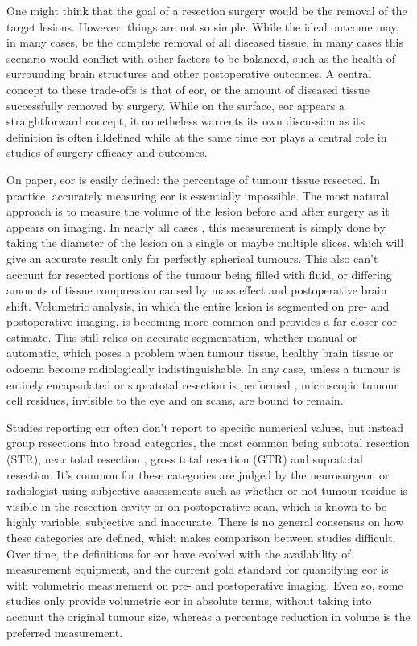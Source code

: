 One might think that the goal of a resection surgery would be the removal of the target lesions.
However, things are not so simple.
While the ideal outcome may, in many cases, be the complete removal of all diseased tissue, in many cases this scenario would conflict with other factors to be balanced, such as the health of surrounding brain structures and other postoperative outcomes.
A central concept to these trade-offs is that of \gls{eor}, or the amount of diseased tissue  successfully removed by surgery.
While on the surface, \gls{eor} appears a straightforward concept, it nonetheless warrents its own discussion as its definition is often illdefined while at the same time \gls{eor} plays a central role in studies of surgery efficacy and outcomes.

On paper, \gls{eor} is easily defined: the percentage of tumour tissue resected.
In practice, accurately measuring \gls{eor} is essentially impossible.
The most natural approach is to measure the volume of the lesion before and after surgery as it appears on imaging.
In nearly all cases , this measurement is simply done by taking the diameter of the lesion on a single or maybe multiple slices, which will give an accurate result only for perfectly spherical tumours.
This also can't account for resected portions of the tumour being filled with fluid, or differing amounts of tissue compression caused by mass effect and postoperative brain shift.
Volumetric analysis, in which the entire lesion is segmented on pre- and postoperative imaging, is becoming more common and provides a far closer \gls{eor} estimate.
This still relies on accurate segmentation, whether manual or automatic, which poses a problem when tumour tissue, healthy brain tissue or odoema become radiologically indistinguishable.
In any case, unless a tumour is entirely encapsulated  or supratotal resection is performed , microscopic tumour cell residues, invisible to the eye and on scans, are bound to remain.

Studies reporting \gls{eor} often don't report to specific numerical values, but instead group resections into broad categories, the most common being subtotal resection (STR), near total resection , gross total resection (GTR) and supratotal resection.
It's common for these categories are judged by the neurosurgeon or radiologist using subjective assessments such as whether or not tumour residue is visible in the resection cavity or on postoperative scan, which is known to be highly variable, subjective and inaccurate.\autocite{Sezer2020,Lau2018}
There is no general consensus on how these categories are defined, which makes comparison between studies difficult.
Over time, the definitions for \gls{eor} have evolved with the availability of measurement equipment, and the current gold standard for quantifying \gls{eor} is with volumetric measurement on pre- and postoperative imaging.\autocite{Rincon-Torroella2019}
Even so, some studies only provide volumetric \gls{eor} in absolute terms, without taking into account the original tumour size, whereas a percentage reduction in volume is the preferred measurement.\autocite{Ius2020,Rincon-Torroella2019,Smith2008} 


